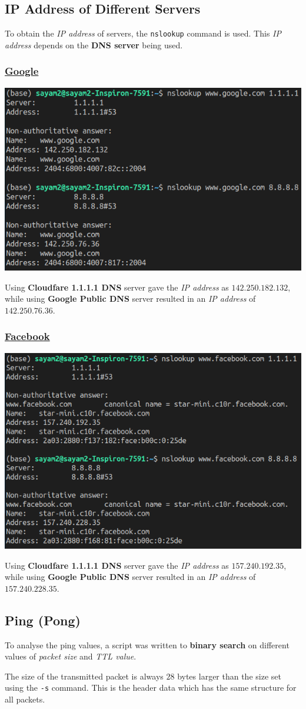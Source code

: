 \documentclass[11pt]{article}
\begin{document}
\subsection{IP Address of Different Servers}
To obtain the \textit{IP address} of servers, the \texttt{nslookup} command is used. This \textit{IP address} depends on the \textbf{DNS server} being used.

\subsubsection{\href{https://www.google.com}{Google}}
\begin{center}
    \includegraphics[width=0.5\linewidth]{figures/nslookup_google.png}
\end{center}
Using \textbf{Cloudfare 1.1.1.1 DNS} server gave the \textit{IP address} as $142.250.182.132$, while using \textbf{Google Public DNS} server resulted in an \textit{IP address} of $142.250.76.36$.

\subsubsection{\href{https://www.facebook.com}{Facebook}}
\begin{center}
    \includegraphics[width=0.5\linewidth]{figures/nslookup_facebook.png}
\end{center}
Using \textbf{Cloudfare 1.1.1.1 DNS} server gave the \textit{IP address} as $157.240.192.35$, while using \textbf{Google Public DNS} server resulted in an \textit{IP address} of $157.240.228.35$.


\subsection{Ping (Pong)}
To analyse the ping values, a script was written to \textbf{binary search} on different values of \textit{packet size} and \textit{TTL value}.\par
The size of the transmitted packet is always $28$ bytes larger than the size set using the \texttt{-s} command. This is the header data which has the same structure for all packets.
\end{document}
